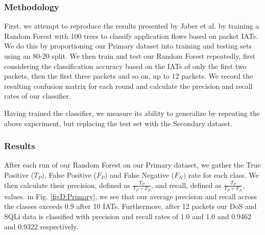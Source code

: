 \subsubsection*{Methodology}

\label{SecD:exp2_method}
First, we attempt to reproduce the results presented by Jaber et al. \cite{jaber2011can} by training a Random Forest with 100 trees to classify application flows based on packet IATs. We do this by proportioning our Primary dataset into training and testing sets using an 80-20 split. We then train and test our Random Forest repeatedly, first considering the classification accuracy based on the IATs of only the first two packets, then the first three packets and so on, up to 12 packets. We record the resulting confusion matrix for each round and calculate the precision and recall rates of our classifier.

Having trained the classifier, we measure its ability to generalize by repeating the above experiment, but replacing the test set with the Secondary dataset.


\subsubsection*{Results}


 After each run of our Random Forest on our Primary dataset, we gather the True Positive ($T_{P}$), False Positive ($F_{P}$) and False Negative ($F_{N})$ rate for each class. We then calculate their precision, defined as $ \frac{T_P}{T_P + F_P}$, and recall, defined as $ \frac{T_P}{T_P + F_N}$, values. in Fig. \ref{figD:Primary}, we see that our average precision and recall across the classes exceeds 0.9 after 10 IATs. Furthermore, after 12 packets our DoS and SQLi data is classified with precision and recall rates of 1.0 and 1.0 and 0.9462 and 0.9322 respectively.

